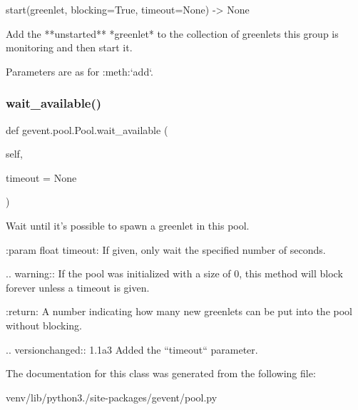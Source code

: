 \begin{DoxyVerb}start(greenlet, blocking=True, timeout=None) -> None

Add the **unstarted** *greenlet* to the collection of greenlets
this group is monitoring and then start it.

Parameters are as for :meth:`add`.
\end{DoxyVerb}
 \mbox{\label{classgevent_1_1pool_1_1_pool_a3bb9b19f625d5a050491655c713dc785}} 
\subsubsection{\texorpdfstring{wait\+\_\+available()}{wait\_available()}}
{\footnotesize\ttfamily def gevent.\+pool.\+Pool.\+wait\+\_\+available (\begin{DoxyParamCaption}\item[{}]{self,  }\item[{}]{timeout = {\ttfamily None} }\end{DoxyParamCaption})}

\begin{DoxyVerb}Wait until it's possible to spawn a greenlet in this pool.

:param float timeout: If given, only wait the specified number
    of seconds.

.. warning:: If the pool was initialized with a size of 0, this
   method will block forever unless a timeout is given.

:return: A number indicating how many new greenlets can be put into
   the pool without blocking.

.. versionchanged:: 1.1a3
    Added the ``timeout`` parameter.
\end{DoxyVerb}
 

The documentation for this class was generated from the following file\+:\begin{DoxyCompactItemize}
\item 
venv/lib/python3./site-\/packages/gevent/pool.\+py\end{DoxyCompactItemize}
